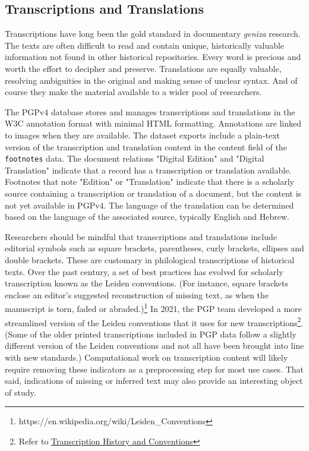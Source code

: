 \documentclass{article}
\begin{document}
\subsection{Transcriptions and Translations}
Transcriptions have long been the gold standard in documentary \textit{geniza }research. The texts are often difficult to read and  contain unique, historically valuable information not found in other historical repositories. Every word is precious and worth the effort to decipher and preserve. Translations are equally valuable, resolving ambiguities in the original and making sense of unclear syntax. And of course they make the material available to a wider pool of researchers.

The PGPv4 database stores and manages transcriptions and translations in the W3C annotation format with minimal HTML formatting. Annotations are linked to images when they are available. The dataset exports include a plain-text version of the transcription and translation content in the content field of the \texttt{footnotes} data. The document relations "Digital Edition" and "Digital Translation" indicate that a record has a  transcription or translation available. Footnotes that note "Edition" or "Translation" indicate that there is a scholarly source containing a transcription or translation of a document, but the content is not yet available in PGPv4. The language of the translation can be determined based on the language of the associated source, typically English and Hebrew.

Researchers should be mindful that transcriptions and translations include editorial symbols such as square brackets, parentheses, curly brackets, ellipses and double brackets. These are customary in philological transcriptions of historical texts. Over the past century, a set of best practices has evolved for scholarly transcription known as the Leiden conventions. (For instance, square brackets enclose an editor’s suggested reconstruction of missing text, as when the manuscript is torn, faded or abraded.)\footnote{https://en.wikipedia.org/wiki/Leiden\_Conventions} In 2021, the PGP team developed a more streamlined version of the Leiden conventions that it uses for new transcriptions\footnote{Refer to \href{https://docs.google.com/document/d/e/2PACX-1vR8kR4zZdnDZXjoLrYrABZn58PRyzrKfEiixQzE9vAzNfzI4Enxs0jU9KO5rTdiH1ZMTPwfqm31mFuX/pub}{Transcription History and Conventions}}. (Some of the older printed transcriptions included in PGP data follow a slightly different version of the Leiden conventions and not all have been brought into line with new standards.) Computational work on transcription content will likely require removing these indicators as a preprocessing step for most use cases. That said, indications of missing or inferred text may also provide an interesting object of study.
\end{document}
